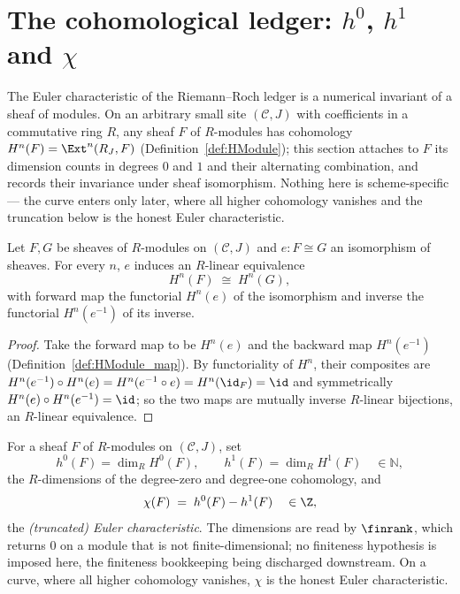 \section{The cohomological ledger:
  \texorpdfstring{\(h^0\), \(h^1\) and \(\chi\)}{h0, h1 and chi}}

The Euler characteristic of the Riemann--Roch ledger is a numerical invariant of a sheaf of
modules. On an arbitrary small site \((\mathcal C, J)\) with coefficients in a commutative ring
\(R\), any sheaf \(F\) of \(R\)-modules has cohomology \(H^n(F) = \Ext^n(R_J, F)\)
(Definition~\ref{def:HModule}); this section attaches to \(F\) its dimension counts in degrees
\(0\) and \(1\) and their alternating combination, and records their invariance under sheaf
isomorphism. Nothing here is scheme-specific --- the curve enters only later, where all higher
cohomology vanishes and the truncation below is the honest Euler characteristic.

\begin{definition}
  \label{def:HModule_mapEquiv}
  \leanok
  Let \(F, G\) be sheaves of \(R\)-modules on \((\mathcal C, J)\) and \(e : F \cong G\) an
  isomorphism of sheaves. For every \(n\), \(e\) induces an \(R\)-linear equivalence
  \[
    H^n(F) \;\cong\; H^n(G),
  \]
  with forward map the functorial \(H^n(e)\) of the isomorphism and inverse the functorial
  \(H^n(e^{-1})\) of its inverse.
\end{definition}
\begin{proof}
  \leanok
  Take the forward map to be \(H^n(e)\) and the backward map \(H^n(e^{-1})\)
  (Definition~\ref{def:HModule_map}). By functoriality of \(H^n\), their composites are
  \(H^n(e^{-1}) \circ H^n(e) = H^n(e^{-1} \circ e) = H^n(\id_F) = \id\) and symmetrically
  \(H^n(e) \circ H^n(e^{-1}) = \id\); so the two maps are mutually inverse \(R\)-linear
  bijections, an \(R\)-linear equivalence.
\end{proof}

\begin{definition}
  \label{def:h0_h1_chi}
  \leanok
  For a sheaf \(F\) of \(R\)-modules on \((\mathcal C, J)\), set
  \[
    h^0(F) = \dim_R H^0(F), \qquad h^1(F) = \dim_R H^1(F) \quad\in \mathbb N,
  \]
  the \(R\)-dimensions of the degree-zero and degree-one cohomology, and
  \[
    \chi(F) \;=\; h^0(F) - h^1(F) \quad\in \Z,
  \]
  the \emph{(truncated) Euler characteristic}. The dimensions are read by \(\finrank\), which
  returns \(0\) on a module that is not finite-dimensional; no finiteness hypothesis is imposed
  here, the finiteness bookkeeping being discharged downstream. On a curve, where all higher
  cohomology vanishes, \(\chi\) is the honest Euler characteristic.
\end{definition}

